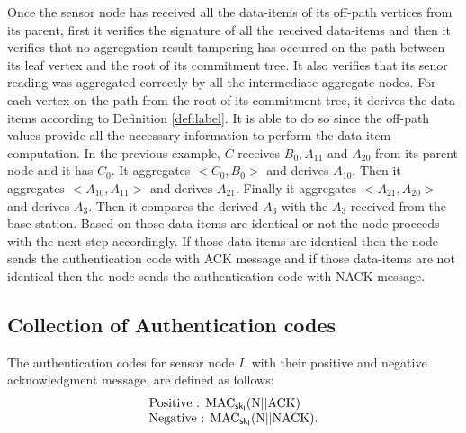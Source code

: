 		Once the sensor node has received all the data-items of its off-path vertices from its parent, first it verifies the signature of all the received data-items and then it verifies that no aggregation result tampering has occurred on the path between its leaf vertex and the root of its commitment tree.
		It also verifies that its senor reading was aggregated correctly by all the intermediate aggregate nodes.
		For each vertex on the path from the root of its commitment tree, it derives the data-items according to Definition \ref{def:label}.
		It is able to do so since the off-path values provide all the necessary information to perform the data-item computation.
		In the previous example, $C$ receives $B_{0}, A_{11}$ and $ A_{20}$ from its parent node and it has $C_{0}$.
		It aggregates $<C_{0}, B_{0}>$ and derives $A_{10}$.
		Then it aggregates $<A_{10},A_{11}>$ and derives $A_{21}$.
		Finally it aggregates $<A_{21}, A_{20}>$ and derives $A_{3}$.
		Then it compares the derived $A_{3}$ with the $A_{3}$ received from the base station.
		Based on those data-items are identical or not the node proceeds with the next step accordingly.
		If those data-items are identical then the node sends the authentication code with ACK message and if those data-items are not identical then the node sends the authentication code with NACK message.

	\subsection{Collection of Authentication codes}
		\label{subsection:collection-of-authentication-codes}
		The authentication codes for sensor node $I$, with their positive and negative acknowledgment message, are defined as follows:
		\begin{equation}
			\begin{array}{l}
				\mbox{Positive : } \mbox{MAC}_{\sf{sk}_{I}}(\mbox{N} || \mbox{ACK})\\
				\mbox{Negative : } \mbox{MAC}_{\sf{sk}_{I}}(\mbox{N} || \mbox{NACK}).
			\end{array}
		\end{equation}

